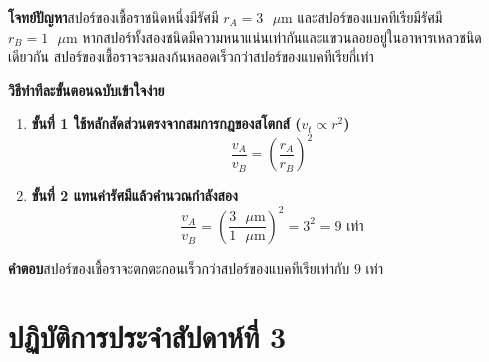 \begin{worked}
\textbf{โจทย์ปัญหา}\quad สปอร์ของเชื้อราชนิดหนึ่งมีรัศมี $r_A = 3\text{ }\mu\text{m}$ และสปอร์ของแบคทีเรียมีรัศมี $r_B = 1\text{ }\mu\text{m}$ หากสปอร์ทั้งสองชนิดมีความหนาแน่นเท่ากันและแขวนลอยอยู่ในอาหารเหลวชนิดเดียวกัน สปอร์ของเชื้อราจะจมลงก้นหลอดเร็วกว่าสปอร์ของแบคทีเรียกี่เท่า

\textbf{วิธีทำทีละขั้นตอนฉบับเข้าใจง่าย}
\begin{enumerate}
    \item \textbf{ขั้นที่ 1 ใช้หลักสัดส่วนตรงจากสมการกฎของสโตกส์ ($v_t \propto r^2$)}
    \[
        \frac{v_A}{v_B} = \left(\frac{r_A}{r_B}\right)^2
    \]
    \item \textbf{ขั้นที่ 2 แทนค่ารัศมีแล้วคำนวณกำลังสอง}
    \[
        \frac{v_A}{v_B} = \left(\frac{3\text{ }\mu\text{m}}{1\text{ }\mu\text{m}}\right)^2 = 3^2 = 9\text{ เท่า}
    \]
\end{enumerate}
\textbf{คำตอบ}\quad สปอร์ของเชื้อราจะตกตะกอนเร็วกว่าสปอร์ของแบคทีเรียเท่ากับ $9$ เท่า
\end{worked}

\section{ปฏิบัติการประจำสัปดาห์ที่ 3}


